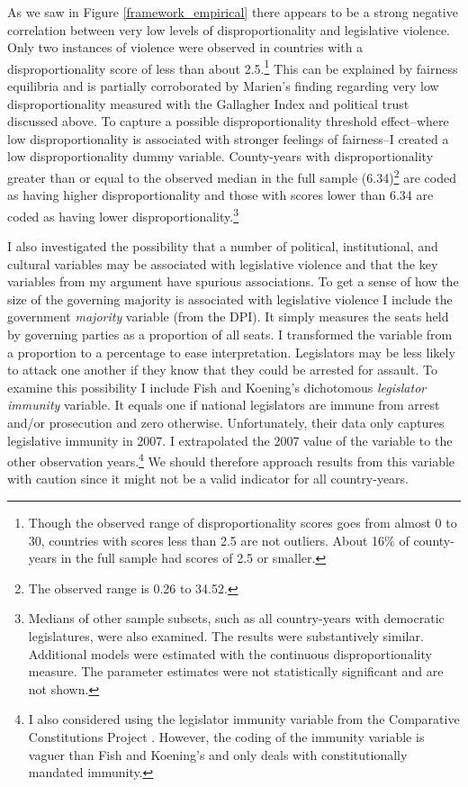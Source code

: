 \documentclass[a4paper]{article}\usepackage[]{graphicx}\usepackage[]{color}
\begin{document}
As we saw in Figure \ref{framework_empirical} there appears to be a strong negative correlation between very low levels of disproportionality and legislative violence. Only two instances of violence were observed in countries with a disproportionality score of less than about 2.5.\footnote{Though the observed range of disproportionality scores goes from almost 0 to 30, countries with scores less than 2.5 are not outliers. About 16\% of county-years in the full sample had scores of 2.5 or smaller.} This can be explained by fairness equilibria and is partially corroborated by Marien's \citeyearpar{Marien2011} finding regarding very low disproportionality measured with the Gallagher Index and political trust discussed above. To capture a possible disproportionality threshold effect--where low disproportionality is associated with stronger feelings of fairness--I created a low disproportionality dummy variable. County-years with disproportionality greater than or equal to the observed median in the full sample (6.34)\footnote{The observed range is 0.26 to 34.52.} are coded as having higher disproportionality and those with scores lower than 6.34 are coded as having lower disproportionality.\footnote{Medians of other sample subsets, such as all country-years with democratic legislatures, were also examined. The results were substantively similar. Additional models were estimated with the continuous disproportionality measure. The parameter estimates were not statistically significant and are not shown.}

I also investigated the possibility that a number of political, institutional, and cultural variables may be associated with legislative violence and that the key variables from my argument have spurious associations. To get a sense of how the size of the governing majority is associated with legislative violence I include the government {\emph{majority}} variable (from the DPI). It simply measures the seats held by governing parties as a proportion of all seats. I transformed the variable from a proportion to a percentage to ease interpretation. Legislators may be less likely to attack one another if they know that they could be arrested for assault. To examine this possibility I include Fish and Koening's \citeyearpar{Fish2009} dichotomous \emph{legislator immunity} variable. It equals one if national legislators are immune from arrest and/or prosecution and zero otherwise. Unfortunately, their data only captures legislative immunity in 2007. I extrapolated the 2007 value of the variable to the other observation years.\footnote{I also considered using the legislator immunity variable from the Comparative Constitutions Project \citep{ElkinsCCP2010}. However, the coding of the immunity variable is vaguer than Fish and Koening's and only deals with constitutionally mandated immunity.} We should therefore approach results from this variable with caution since it might not be a valid indicator for all country-years.
\end{document}

